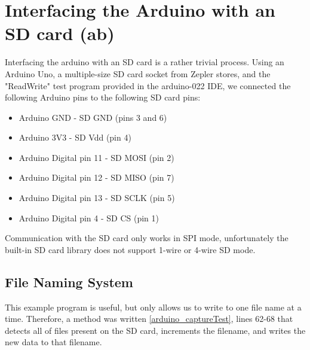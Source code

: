 \section{Interfacing the Arduino with an SD card (ab)}

Interfacing the arduino with an SD card is a rather trivial process. Using an Arduino Uno, a multiple-size SD card socket from Zepler stores, and the 
"ReadWrite" test program provided in the arduino-022 IDE, we connected the following Arduino pins to the following SD card pins:

\begin{itemize}
\item Arduino GND - SD GND (pins 3 and 6)
\item Arduino 3V3 - SD Vdd (pin 4)
\item Arduino Digital pin 11 - SD MOSI (pin 2)
\item Arduino Digital pin 12 - SD MISO (pin 7)
\item Arduino Digital pin 13 - SD SCLK (pin 5)
\item Arduino Digital pin 4 - SD CS (pin 1)
\end{itemize}

Communication with the SD card only works in SPI mode, unfortunately the built-in 
SD card library does not support 1-wire or 4-wire SD mode.

\subsection{File Naming System}

This example program is useful, but only allows us to write to one file name at 
a time. Therefore, a method was written \ref{arduino_captureTest}, lines 62-68 that detects all of files present on the SD card, increments the filename, and 
writes the new data to that filename.
